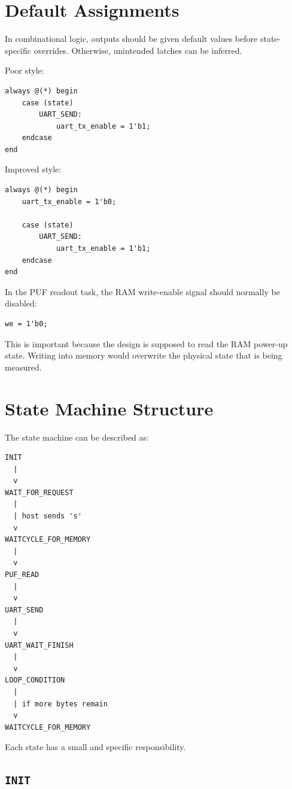 \documentclass[11pt,a4paper]{article}
\begin{document}
\section{Default Assignments}

In combinational logic, outputs should be given default values before state-specific overrides. Otherwise, unintended latches can be inferred.

Poor style:

\begin{lstlisting}
always @(*) begin
    case (state)
        UART_SEND:
            uart_tx_enable = 1'b1;
    endcase
end
\end{lstlisting}

Improved style:

\begin{lstlisting}
always @(*) begin
    uart_tx_enable = 1'b0;

    case (state)
        UART_SEND:
            uart_tx_enable = 1'b1;
    endcase
end
\end{lstlisting}

In the PUF readout task, the RAM write-enable signal should normally be disabled:

\begin{lstlisting}
we = 1'b0;
\end{lstlisting}

This is important because the design is supposed to read the RAM power-up state. Writing into memory would overwrite the physical state that is being measured.

\section{State Machine Structure}

The state machine can be described as:

\begin{verbatim}
INIT
  |
  v
WAIT_FOR_REQUEST
  |
  | host sends 's'
  v
WAITCYCLE_FOR_MEMORY
  |
  v
PUF_READ
  |
  v
UART_SEND
  |
  v
UART_WAIT_FINISH
  |
  v
LOOP_CONDITION
  |
  | if more bytes remain
  v
WAITCYCLE_FOR_MEMORY
\end{verbatim}

Each state has a small and specific responsibility.

\subsection{\texttt{INIT}}
\end{document}
